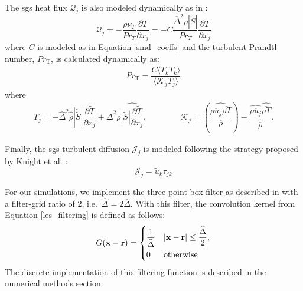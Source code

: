 The \gls{sgs} heat flux $\mathcal{Q}_j$ is also modeled dynamically as in \cite{LES_Comp}:
\begin{equation} \label{sgs_heat_flux}
\mathcal{Q}_j = - \dfrac{\overline{\rho}\nu_T}{Pr_T} \dfrac{\partial \widetilde{T}}{\partial x_j} = - C\dfrac{\overline{\Delta}^2 \overline{\rho}  |\widetilde{S}|}{Pr_T} \dfrac{\partial \widetilde{T}}{\partial x_j} 
\end{equation}
where $C$ is modeled as in Equation \ref{smd_coeffs} and the turbulent Prandtl number, $Pr_\text{T}$, is calculated dynamically as:
\begin{equation}
\begin{aligned}
	Pr_\text{T} = \dfrac{C \langle T_k T_k  \rangle}{\langle \mathcal{K}_j T_j \rangle}
\end{aligned}
\end{equation}
where 
\begin{equation}
\begin{aligned}
	T_j = - \widehat{\Delta}^2  \widehat{\overline{\rho}} |\breve{\widetilde{S}}| \dfrac{\partial \breve{\widetilde{T}}}{\partial x_j} +  \overline{\Delta}^2  \overline{\rho} \widehat{|\widetilde{S}| \dfrac{\partial \widetilde{T}}{\partial x_j}}, \qquad \qquad \mathcal{K}_j = \left( \dfrac{ \widehat{\overline{\rho u_j} \overline{\rho T}}}{\overline{\rho}} \right) - \dfrac{ \widehat{\overline{\rho u_j}} \widehat{ \overline{\rho T}}}{\widehat{\overline{\rho}}}.
\end{aligned}
\end{equation}

Finally, the \gls{sgs} turbulent diffusion $\mathcal{J}_j$ is modeled following the strategy proposed by Knight et al. \cite{knight}:
\begin{equation} \label{sgs_turb_diff}
\mathcal{J}_j = \widetilde{u}_k \tau_{jk}
\end{equation}

For our simulations, we implement the three point box filter as described in \cite{filter} with a filter-grid ratio of 2, i.e.\  $\widehat{\Delta}=2\overline{\Delta}$. With this filter, the convolution kernel from Equation \ref{les_filtering} is defined as follows: 
\begin{equation} \label{LES_cont_filter}
G(\vb{x} - \vb{r}) = 
\begin{cases} 
      \dfrac{1}{\widehat{\Delta}} & |\vb{x} - \vb{r}|\leq \dfrac{\widehat{\Delta}}{2}, \vspace{2pt}\\ 
      0 & \text{otherwise}
   \end{cases}
\end{equation}
The discrete implementation of this filtering function is described in the numerical methods section. 

